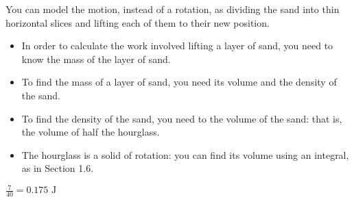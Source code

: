 \begin{hint}
You can model the motion, instead of a rotation, as dividing the sand into thin horizontal slices and lifting each of them to their new position.
\begin{itemize}
\item In order to calculate the work involved lifting a layer of sand, you need to know the mass of the layer of sand.
\item To find the mass of a layer of sand, you need its volume and the density of the sand.
\item To find the density of the sand, you need to the volume of the sand: that is, the volume of half the hourglass.
\item The hourglass is a solid of rotation: you can find its volume using an integral, as in Section 1.6.
\end{itemize}
\end{hint}
\begin{answer}
$\displaystyle\frac{7}{40}= 0.175 \text{ J}$
\end{answer}
